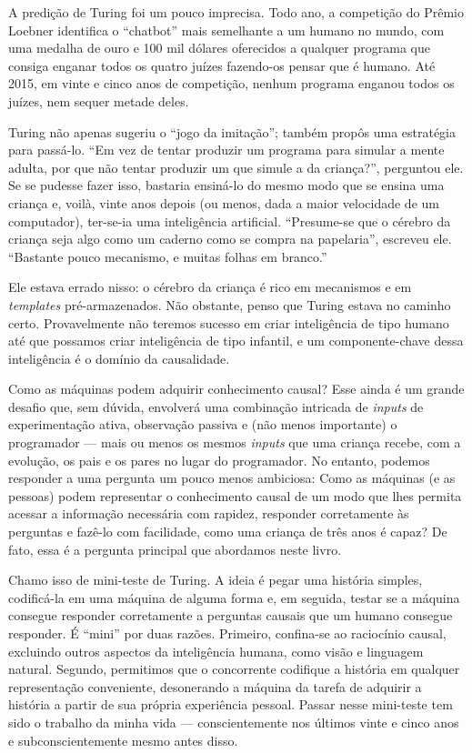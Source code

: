 \documentclass[11pt,a5paper,twoside]{book}
\begin{document}
A predição de Turing foi um pouco imprecisa. Todo ano, a competição do Prêmio Loebner identifica o “chatbot” mais semelhante a um humano no mundo, com uma medalha de ouro e 100 mil dólares oferecidos a qualquer programa que consiga enganar todos os quatro juízes fazendo-os pensar que é humano. Até 2015, em vinte e cinco anos de competição, nenhum programa enganou todos os juízes, nem sequer metade deles.

Turing não apenas sugeriu o “jogo da imitação”; também propôs uma estratégia para passá-lo. “Em vez de tentar produzir um programa para simular a mente adulta, por que não tentar produzir um que simule a da criança?”, perguntou ele. Se se pudesse fazer isso, bastaria ensiná-lo do mesmo modo que se ensina uma criança e, voilà, vinte anos depois (ou menos, dada a maior velocidade de um computador), ter-se-ia uma inteligência artificial. “Presume-se que o cérebro da criança seja algo como um caderno como se compra na papelaria”, escreveu ele. “Bastante pouco mecanismo, e muitas folhas em branco.”

Ele estava errado nisso: o cérebro da criança é rico em mecanismos e em \textit{templates} pré-armazenados. Não obstante, penso que Turing estava no caminho certo. Provavelmente não teremos sucesso em criar inteligência de tipo humano até que possamos criar inteligência de tipo infantil, e um componente-chave dessa inteligência é o domínio da causalidade.

Como as máquinas podem adquirir conhecimento causal? Esse ainda é um grande desafio que, sem dúvida, envolverá uma combinação intricada de \textit{inputs} de experimentação ativa, observação passiva e (não menos importante) o programador — mais ou menos os mesmos \textit{inputs} que uma criança recebe, com a evolução, os pais e os pares no lugar do programador. No entanto, podemos responder a uma pergunta um pouco menos ambiciosa: Como as máquinas (e as pessoas) podem representar o conhecimento causal de um modo que lhes permita acessar a informação necessária com rapidez, responder corretamente às perguntas e fazê-lo com facilidade, como uma criança de três anos é capaz? De fato, essa é a pergunta principal que abordamos neste livro.

Chamo isso de mini-teste de Turing. A ideia é pegar uma história simples, codificá-la em uma máquina de alguma forma e, em seguida, testar se a máquina consegue responder corretamente a perguntas causais que um humano consegue responder. É “mini” por duas razões. Primeiro, confina-se ao raciocínio causal, excluindo outros aspectos da inteligência humana, como visão e linguagem natural. Segundo, permitimos que o concorrente codifique a história em qualquer representação conveniente, desonerando a máquina da tarefa de adquirir a história a partir de sua própria experiência pessoal. Passar nesse mini-teste tem sido o trabalho da minha vida — conscientemente nos últimos vinte e cinco anos e subconscientemente mesmo antes disso.
\end{document}
